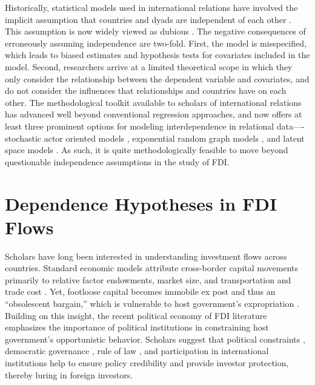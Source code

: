 \documentclass{article}
\begin{document}
Historically, statistical models used in international relations have involved the implicit assumption that countries and dyads are independent of each other \citep{diehl2016conditional,ward2007persistent}. This assumption is now widely viewed as dubious \citep[see, e.g., ][]{ward2007persistent, chu2010homogenization,cranmer2016critique,dorff2013networks,lee2013network,howell2013geography,kinne2016agreeing}. The negative consequences of erroneously assuming independence are two-fold. First, the model is misspecified, which leads to biased estimates and hypothesis tests for covariates included in the model. Second, researchers arrive at a limited theoretical scope in which they only consider the relationship between the dependent variable and covariates, and do not consider the influences that relationships and countries have on each other. The methodological toolkit available to scholars of international relations has advanced well beyond conventional regression approaches, and now offers at least three prominent options for modeling interdependence in relational data----stochastic actor oriented models \citep[e.g., ][]{camber2010geometry,kinne2016agreeing,kinne2013network,kinne2014dependent,warren2016modeling}, exponential random graph models \citep[e.g.,][]{cranmer2012complex,cranmer2012toward,raeymaeckers2016influence}, and latent space models \citep[e.g., ][]{ward2007disputes,ward2013gravity,metternich2013antigovernment}. As such, it is quite methodologically feasible to move beyond questionable independence assumptions in the study of FDI.

\section{Dependence Hypotheses in FDI Flows}

Scholars have long been interested in understanding investment flows across countries. Standard economic models attribute cross-border capital movements primarily to relative factor endowments, market size, and transportation and trade cost \citep[see,~e.g.,][]{Helpman:1984,Carr_et_al:2001}. Yet, footloose capital becomes immobile ex post and thus an ``obsolescent bargain,'' which is vulnerable to host government's expropriation \citep{Vernon:1971,Vernon:1980}. Building on this insight, the recent political economy of FDI literature emphasizes the importance of political institutions in constraining host government's opportunistic behavior. Scholars suggest that political constraints \citep{Henisz:2000}, democratic governance \citep{Jensen:2003,Jensen:2006}, rule of law \citep{Li_Resnick:2003,Staats_Biglaiser:2012}, and participation in international institutions \citep{Buthe_Milner:2008,Allee_Peinhardt:2011} help to ensure policy credibility and provide investor protection, thereby luring in foreign investors.
\end{document}
